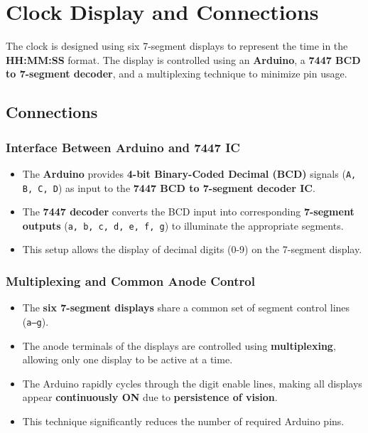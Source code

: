 \documentclass[journal]{IEEEtran}
\begin{document}
\section{Clock Display and Connections}

The clock is designed using six 7-segment displays to represent the time in the \textbf{HH:MM:SS} format. The display is controlled using an \textbf{Arduino}, a \textbf{7447 BCD to 7-segment decoder}, and a multiplexing technique to minimize pin usage.



\subsection{Connections}

\subsubsection{Interface Between Arduino and 7447 IC}
\begin{itemize}
    \item The \textbf{Arduino} provides \textbf{4-bit Binary-Coded Decimal (BCD)} signals (\texttt{A, B, C, D}) as input to the \textbf{7447 BCD to 7-segment decoder IC}.
    \item The \textbf{7447 decoder} converts the BCD input into corresponding \textbf{7-segment outputs} (\texttt{a, b, c, d, e, f, g}) to illuminate the appropriate segments.
    \item This setup allows the display of decimal digits (0-9) on the 7-segment display.
\end{itemize}

\subsubsection{Multiplexing and Common Anode Control}
\begin{itemize}
    \item The \textbf{six 7-segment displays} share a common set of segment control lines (\texttt{a--g}).
    \item The anode terminals of the displays are controlled using \textbf{multiplexing}, allowing only one display to be active at a time.
    \item The Arduino rapidly cycles through the digit enable lines, making all displays appear \textbf{continuously ON} due to \textbf{persistence of vision}.
    \item This technique significantly reduces the number of required Arduino pins.
\end{itemize}
\end{document}

